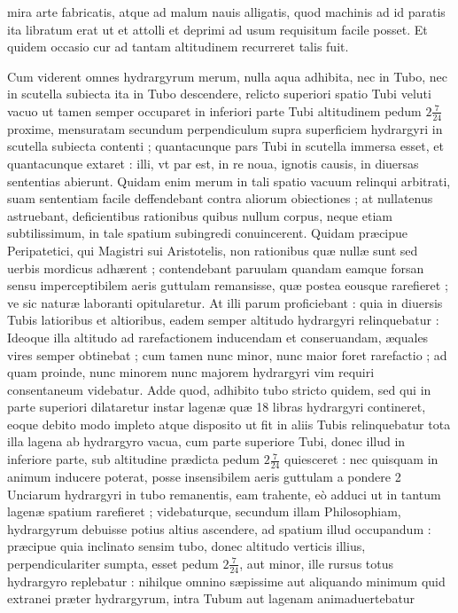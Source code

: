 \documentclass[11pt,a4paper]{article}
\begin{document}

mira arte fabricatis, atque ad malum nauis alligatis, quod machinis ad id paratis ita libratum erat ut et attolli et deprimi ad usum requisitum facile posset. Et quidem occasio cur ad tantam altitudinem recurreret talis fuit.

Cum viderent omnes hydrargyrum merum, \struck{\ill{}} nulla aqua adhibita, nec in Tubo, nec in scutella subiecta ita in Tubo descendere, relicto superiori spatio Tubi veluti vacuo ut tamen semper occuparet in inferiori parte Tubi altitudinem pedum $2\frac{7}{24}$ proxime, mensuratam secundum perpendiculum supra superficiem hydrargyri in scutella subiecta contenti ; quantacunque pars Tubi in scutella immersa esset, et quantacunque extaret : illi, vt par est, in re noua, ignotis causis, in diuersas sententias abierunt. Quidam enim merum in tali spatio vacuum relinqui arbitrati, suam sententiam facile deffendebant contra aliorum obiectiones ; at nullatenus astruebant, deficientibus rationibus quibus nullum corpus, neque etiam subtilissimum, in tale spatium subingredi conuincerent. Quidam præcipue Peripatetici, qui Magistri sui Aristotelis, non rationibus quæ nullæ sunt sed uerbis mordicus adhærent ; contendebant paruulam quandam eamque forsan sensu imperceptibilem aeris guttulam remansisse, quæ postea eousque rarefieret ; ve sic naturæ laboranti opitularetur. At illi parum proficiebant : quia in diuersis Tubis latioribus et altioribus, eadem semper altitudo hydrargyri relinquebatur : Ideoque illa altitudo ad rarefactionem inducendam et conseruandam, æquales vires semper obtinebat ; cum tamen nunc minor, nunc maior foret rarefactio ; ad quam proinde, nunc minorem nunc majorem hydrargyri vim requiri consentaneum videbatur. Adde quod, adhibito tubo stricto quidem, sed qui in parte superiori dilataretur instar lagenæ quæ 18 libras hydrargyri contineret, eoque debito modo impleto atque disposito ut fit in aliis Tubis relinquebatur tota illa lagena ab hydrargyro vacua, cum parte superiore Tubi, donec illud in inferiore \struck{\ill{}} parte, sub altitudine prædicta pedum $2\frac{7}{24}$ quiesceret : nec quisquam in animum inducere poterat, posse insensibilem aeris guttulam a pondere 2 Unciarum hydrargyri in tubo remanentis, eam trahente, eò adduci ut in tantum lagenæ spatium rarefieret ; videbaturque, secundum illam Philosophiam, hydrargyrum debuisse potius altius ascendere, ad spatium illud occupandum : præcipue quia inclinato sensim tubo, donec altitudo verticis illius, perpendiculariter sumpta, esset pedum $2\frac{7}{24}$, aut minor, ille rursus totus hydrargyro replebatur : nihilque omnino sæpissime aut aliquando minimum quid extranei præter hydrargyrum, intra Tubum aut lagenam animaduertebatur
\end{document}
